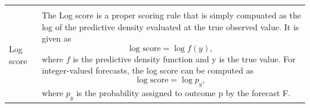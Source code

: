 \documentclass[
]{jss}
\begin{document}
\begin{CodeChunk}
\begin{longtable}[t]{>{\raggedright\arraybackslash}p{1.1in}>{\raggedright\arraybackslash}p{4.625in}}
\cellcolor{gray!6}{  \textbf{Usage and caveats} Smaller values are better. The crps is a good choice for most practical purposes that involve decision making, as it takes the entire predictive distribution into account. If two forecasters assign the same probability to the true event $y$, then the forecaster who assigned high probability to events far away from $y$ will still get a worse score. The crps (in contrast to the log score) can at times be quite lenient towards extreme mispredictions. Also, due to it's similarity to the absolute error, the level of scores depend a lot on the absolute value of what is predicted, which makes it hard to compare scores of forecasts for quantities that are orders of magnitude apart.}\\
\addlinespace
Log score & The Log score is a proper scoring rule that is simply compuated as the log of the predictive density evaluated at the true observed value. It is given as
  $$ \text{log score} = \log f(y), $$
  where $f$ is the predictive density function and y is the true value. For integer-valued forecasts, the log score can be computed as
  $$ \text{log score} = \log p_y, $$
  where $p_y$ is the probability assigned to outcome p by the forecast F.


\end{longtable}
\end{CodeChunk}
\end{document}
